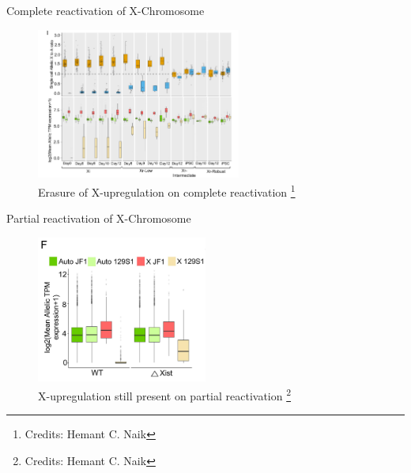 \documentclass[aspectratio=169,9pt]{beamer}
\begin{document}
    \begin{frame}{Complete reactivation of X-Chromosome}
        \begin{figure}
            \centering
            \includegraphics[width=0.6\textwidth]{ipsc}
            \caption{Erasure of X-upregulation on complete reactivation \footnote{Credits: Hemant C. Naik}}
        \end{figure}
    \end{frame}

    \begin{frame}{Partial reactivation of X-Chromosome}
        \begin{figure}
            \centering
            \includegraphics[width=0.5\textwidth]{partial}
            \caption{X-upregulation still present on partial reactivation \footnote{Credits: Hemant C. Naik}}
        \end{figure}
    \end{frame}
\end{document}
